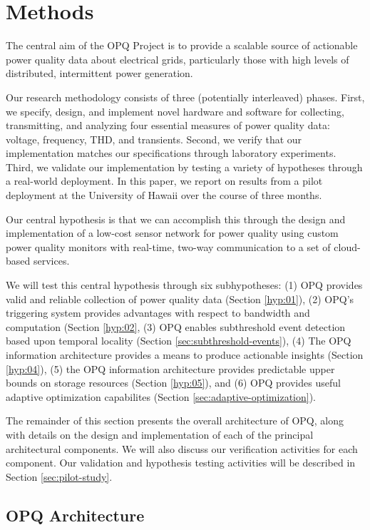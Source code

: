 \section{Methods}

The central aim of the OPQ Project is to provide a scalable source of actionable power quality data about electrical grids, particularly those with high levels of distributed, intermittent power generation.

Our research methodology consists of three (potentially interleaved) phases. First, we specify, design, and implement novel hardware and software for collecting, transmitting, and analyzing four essential measures of power quality data: voltage, frequency, THD, and transients. Second, we verify that our implementation matches our specifications through laboratory experiments.  Third, we validate our implementation by testing a variety of hypotheses through a real-world deployment. In this paper, we report on results from a pilot deployment at the University of Hawaii over the course of three months.

Our central hypothesis is that we can accomplish this through the design and implementation of a low-cost sensor network for power quality using custom power quality monitors with real-time, two-way communication to a set of cloud-based services.

We will test this central hypothesis through six subhypotheses: (1) OPQ provides valid and reliable collection of power quality data (Section \ref{hyp:01}), (2) OPQ's triggering system provides advantages with respect to bandwidth and computation (Section \ref{hyp:02}, (3) OPQ enables subthreshold event detection based upon temporal locality (Section \ref{sec:subthreshold-events}), (4) The OPQ information architecture provides a means to produce actionable insights (Section \ref{hyp:04}), (5) the OPQ information architecture provides predictable upper bounds on storage resources (Section \ref{hyp:05}), and (6) OPQ provides useful adaptive optimization capabilites (Section \ref{sec:adaptive-optimization}).

The remainder of this section presents the overall architecture of OPQ, along with details on the design and implementation of each of the principal architectural components. We will also discuss our verification activities for each component. Our validation and hypothesis testing activities will be described in Section \ref{sec:pilot-study}.

\subsection{OPQ Architecture}


